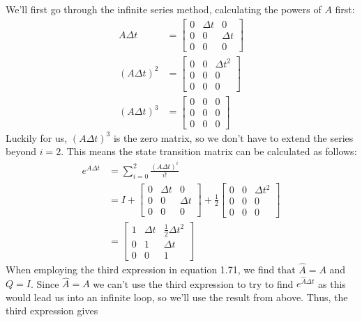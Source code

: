 \documentclass[11pt]{article}
\begin{document}
\subparagraph*{}
We'll first go through the infinite series method, calculating the powers of $A$ first:
\begin{align*}
	A\Delta t &= \begin{bmatrix} 0 & \Delta t & 0 \\
								 0 & 0 & \Delta t \\
								 0 & 0 & 0 \end{bmatrix} \\
	(A\Delta t)^2 &= \begin{bmatrix} 0 & 0 & \Delta t^2 \\
									 0 & 0 & 0 \\
									 0 & 0 & 0 \end{bmatrix} \\
	(A\Delta t)^3 &= \begin{bmatrix} 0 & 0 & 0 \\
									 0 & 0 & 0 \\
									 0 & 0 & 0 \end{bmatrix}
\end{align*}
Luckily for us, $(A\Delta t)^3$ is the zero matrix, so we don't have to extend the series beyond $i=2$. This means the state transition matrix can be calculated as follows:
\begin{align*}
	e^{A\Delta t} &= \sum_{i=0}^2 \frac{(A\Delta t)^i}{i!} \\
	&= I + \begin{bmatrix} 0 & \Delta t & 0 \\
						   0 & 0 & \Delta t \\
						   0 & 0 & 0 \end{bmatrix} 
		+ \frac{1}{2} \begin{bmatrix} 0 & 0 & \Delta t^2 \\
									  0 & 0 & 0 \\
									  0 & 0 & 0 \end{bmatrix} \\
	&= \begin{bmatrix} 1 & \Delta t & \frac{1}{2}\Delta t^2 \\
					   0 & 1 & \Delta t \\
					   0 & 0 & 1 \end{bmatrix}
\end{align*}
When employing the third expression in equation 1.71, we find that $\hat{A} = A$ and $Q = I$. Since $\hat{A} = A$ we can't use the third expression to try to find $e^{\hat{A}\Delta t}$ as this would lead us into an infinite loop, so we'll use the result from above. Thus, the third expression gives
\end{document}

